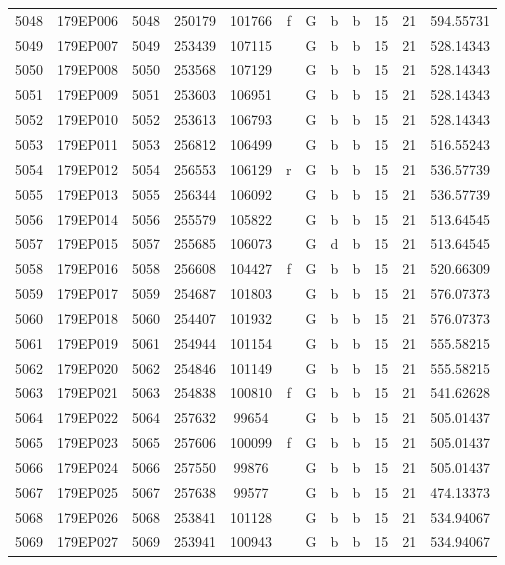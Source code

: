 \begin{tabular}{|*{12}{c|}}
5048 & 179EP006 & 5048 & 250179 & 101766 & f & G & b & b & 15 & 21 & 594.55731 \\ 
5049 & 179EP007 & 5049 & 253439 & 107115 &  & G & b & b & 15 & 21 & 528.14343 \\ 
5050 & 179EP008 & 5050 & 253568 & 107129 &  & G & b & b & 15 & 21 & 528.14343 \\ 
5051 & 179EP009 & 5051 & 253603 & 106951 &  & G & b & b & 15 & 21 & 528.14343 \\ 
5052 & 179EP010 & 5052 & 253613 & 106793 &  & G & b & b & 15 & 21 & 528.14343 \\ 
5053 & 179EP011 & 5053 & 256812 & 106499 &  & G & b & b & 15 & 21 & 516.55243 \\ 
5054 & 179EP012 & 5054 & 256553 & 106129 & r & G & b & b & 15 & 21 & 536.57739 \\ 
5055 & 179EP013 & 5055 & 256344 & 106092 &  & G & b & b & 15 & 21 & 536.57739 \\ 
5056 & 179EP014 & 5056 & 255579 & 105822 &  & G & b & b & 15 & 21 & 513.64545 \\ 
5057 & 179EP015 & 5057 & 255685 & 106073 &  & G & d & b & 15 & 21 & 513.64545 \\ 
5058 & 179EP016 & 5058 & 256608 & 104427 & f & G & b & b & 15 & 21 & 520.66309 \\ 
5059 & 179EP017 & 5059 & 254687 & 101803 &  & G & b & b & 15 & 21 & 576.07373 \\ 
5060 & 179EP018 & 5060 & 254407 & 101932 &  & G & b & b & 15 & 21 & 576.07373 \\ 
5061 & 179EP019 & 5061 & 254944 & 101154 &  & G & b & b & 15 & 21 & 555.58215 \\ 
5062 & 179EP020 & 5062 & 254846 & 101149 &  & G & b & b & 15 & 21 & 555.58215 \\ 
5063 & 179EP021 & 5063 & 254838 & 100810 & f & G & b & b & 15 & 21 & 541.62628 \\ 
5064 & 179EP022 & 5064 & 257632 & 99654 &  & G & b & b & 15 & 21 & 505.01437 \\ 
5065 & 179EP023 & 5065 & 257606 & 100099 & f & G & b & b & 15 & 21 & 505.01437 \\ 
5066 & 179EP024 & 5066 & 257550 & 99876 &  & G & b & b & 15 & 21 & 505.01437 \\ 
5067 & 179EP025 & 5067 & 257638 & 99577 &  & G & b & b & 15 & 21 & 474.13373 \\ 
5068 & 179EP026 & 5068 & 253841 & 101128 &  & G & b & b & 15 & 21 & 534.94067 \\ 
5069 & 179EP027 & 5069 & 253941 & 100943 &  & G & b & b & 15 & 21 & 534.94067 \\ 

\end{tabular}
